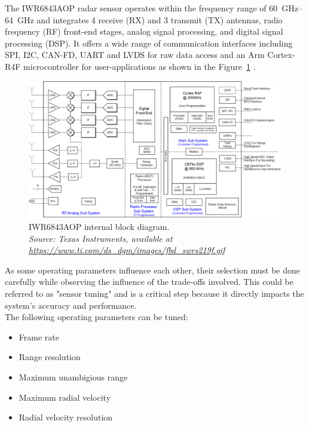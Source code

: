 \par
The IWR6843AOP radar sensor operates within the frequency range of \SIrange{60}{64}{\giga\hertz} and integrates 4 receive (RX) and 3 transmit (TX) antennas, radio frequency (RF) front-end stages, analog signal processing, and digital signal processing (DSP).
It offers a wide range of communication interfaces including SPI, I2C, CAN-FD, UART and LVDS for raw data access and an Arm Cortex-R4F microcontroller for user-applications as shown in the Figure~\ref{fig:IWR6843AOP_internal} \cite{dev_board_page}.

\begin{figure}[!htbp]
    \centering
    \includegraphics[width=1.0\linewidth]{images/blockdiagram.png}
    \caption{IWR6843AOP internal block diagram.\\
    \textit{Source: Texas Instruments, available at \url{https://www.ti.com/ds_dgm/images/fbd_swrs219f.gif}}}
    \label{fig:IWR6843AOP_internal}
\end{figure}

As some operating parameters influence each other, their selection must be done carefully while observing the influence of the trade-offs involved.
This could be referred to as "sensor tuning" and is a critical step because it directly impacts the system's accuracy and performance.
\\
\newline
\newline
\newline
\newline
The following operating parameters can be tuned:
\begin{itemize}
    \item Frame rate
    \item Range resolution
    \item Maximum unambigious range
    \item Maximum radial velocity
    \item Radial velocity resolution
\end{itemize}

